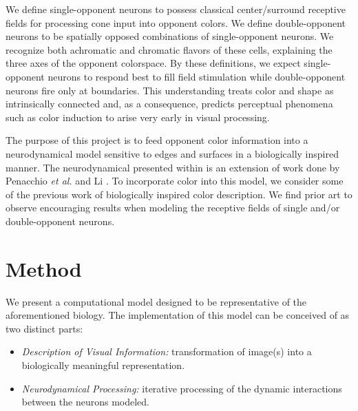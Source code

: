 \documentclass[journal,onecolumn]{IEEEtran}
\begin{document}
We define single-opponent neurons to possess classical center/surround receptive fields for processing cone input into opponent colors. We define double-opponent neurons to be spatially opposed combinations of single-opponent neurons. We recognize both achromatic and chromatic flavors of these cells, explaining the three axes of the opponent colorspace. By these definitions, we expect single-opponent neurons to respond best to fill field stimulation while double-opponent neurons fire only at boundaries. This understanding treats color and shape as intrinsically connected and, as a consequence, predicts perceptual phenomena such as color induction to arise very early in visual processing.

The purpose of this project is to feed opponent color information into a neurodynamical model sensitive to edges and surfaces in a biologically inspired manner. The neurodynamical presented within is an extension of work done by Penacchio \textit{et al.} \cite{penacchio:2013} and Li \cite{li:1999}. To incorporate color into this model, we consider some of the previous work of biologically inspired color description. We find prior art to observe encouraging results when modeling the receptive fields of single and/or double-opponent neurons.


%
%
%
\section{Method}

We present a computational model designed to be representative of the aforementioned biology. The implementation of this model can be conceived of as two distinct parts:
\begin{itemize}
    \item \textit{Description of Visual Information:} transformation of image(s) into a biologically meaningful representation.
    \item \textit{Neurodynamical Processing:} iterative processing of the dynamic interactions between the neurons modeled.
\end{itemize}
\end{document}

